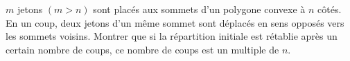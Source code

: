 $m$ jetons $(m > n)$ sont placés aux sommets d'un polygone convexe à $n$ côtés. En un coup, deux jetons d'un même sommet sont déplacés en sens opposés vers les sommets voisins. Montrer que si la répartition initiale est rétablie après un certain nombre de coups, ce nombre de coups est un multiple de $n$.
